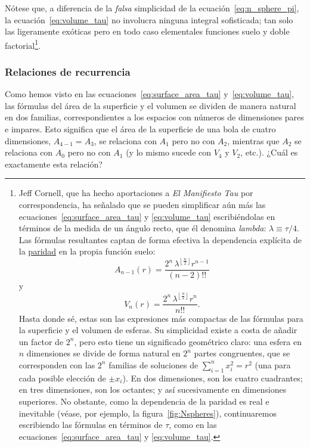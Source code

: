 Nótese que, a diferencia de la \emph{falsa} simplicidad de la ecuación~\eqref{eq:n_sphere_pi}, la ecuación~\eqref{eq:volume_tau} no involucra ninguna integral sofisticada; tan solo las ligeramente exóticas pero en todo caso elementales funciones suelo y doble factorial\footnote{Jeff Cornell, que ha hecho aportaciones a \emph{El Manifiesto Tau} por correspondencia, ha señalado que se pueden simplificar aún más las ecuaciones~\eqref{eq:surface_area_tau} y \eqref{eq:volume_tau} escribiéndolas en términos de la medida de un ángulo recto, que él denomina \emph{lambda}: $\lambda \equiv \tau/4$. Las fórmulas resultantes captan de forma efectiva la dependencia explícita de la \href{https://es.wikipedia.org/wiki/N%C3%BAmeros_pares_e_impares}{paridad} en la propia función suelo: 
\[
A_{n-1}(r) = \frac{2^n\,\lambda^{\left\lfloor \frac{n}{2} \right\rfloor} r^{n-1}}{(n-2)!!}
\]
y 
\[
V_n(r) = \frac{2^n\,\lambda^{\left\lfloor \frac{n}{2} \right\rfloor} r^n}{n!!}.
\]
Hasta donde sé, estas son las expresiones más compactas de las fórmulas para la superficie y el volumen de esferas. Su simplicidad existe a costa de añadir un factor de $2^n$, pero esto tiene un significado geométrico claro: una esfera en $n$ dimensiones se divide de forma natural en $2^n$ partes congruentes, que se corresponden con las $2^n$ familias de soluciones de $\sum_{i=1}^{n} x_i^2 = r^2$ (una para cada posible elección de $\pm x_i$). En dos dimensiones, son los cuatro cuadrantes; en tres dimensiones, son los octantes; y así sucesivamente en dimensiones superiores. No obstante, como la dependencia de la paridad es real e inevitable (véase, por ejemplo, la figura~\ref{fig:Nspheres}), continuaremos escribiendo las fórmulas en términos de $\tau$, como en las ecuaciones~\eqref{eq:surface_area_tau} y \eqref{eq:volume_tau}.}.


\subsubsection{Relaciones de recurrencia} %
\label{sec:recurrences}

Como hemos visto en las ecuaciones~\eqref{eq:surface_area_tau} y~\eqref{eq:volume_tau}, las fórmulas del área de la superficie y el volumen se dividen de manera natural en dos familias, correspondientes a los espacios con números de dimensiones pares e impares. Esto significa que el área de la superficie de una bola de cuatro dimensiones, $A_{4-1} = A_3$, se relaciona con $A_1$ pero no con $A_2$, mientras que $A_2$ se relaciona con $A_0$ pero no con $A_1$ (y lo mismo sucede con $V_4$ y $V_2$, etc.). ¿Cuál es exactamente esta relación?

